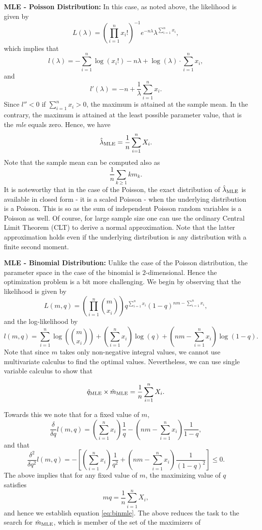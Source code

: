\documentclass[]{book}
\theoremstyle{definition}
\theoremstyle{definition}
\theoremstyle{definition}
\theoremstyle{remark}
\begin{document}
\textbf{MLE - Poisson Distribution:} In this case, as noted above, the
likelihood is given by \[
L(\lambda)=\left(\prod_{i=1}^n x_i!\right)^{-1}e^{-n\lambda}\lambda^{\sum_{i=1}^n x_i},
\] which implies that \[
l(\lambda)= -\sum_{i=1}^n \log(x_i!) -n\lambda +\log(\lambda) \cdot \sum_{i=1}^n x_i,
\] and \[
l'(\lambda)= -n +\frac{1}{\lambda}\sum_{i=1}^n x_i.
\] Since \(l''< 0\) if \(\sum_{i=1}^n x_i>0\), the maximum is attained
at the sample mean. In the contrary, the maximum is attained at the
least possible parameter value, that is the \emph{mle} equals zero.
Hence, we have\\
\[
\hat{\lambda}_{\rm MLE} = \frac{1}{n}\sum_{i=1}^n X_i. 
\] Note that the sample mean can be computed also as \[
\frac{1}{n} \sum_{k\geq 1} km_k.
\] It is noteworthy that in the case of the Poisson, the exact
distribution of \(\hat{\lambda}_{\rm MLE}\) is available in closed form
- it is a scaled Poisson - when the underlying distribution is a
Poisson. This is so as the sum of independent Poisson random variables
is a Poisson as well. Of course, for large sample size one can use the
ordinary Central Limit Theorem (CLT) to derive a normal approximation.
Note that the latter approximation holds even if the underlying
distribution is any distribution with a finite second moment.

\textbf{MLE - Binomial Distribution:} Unlike the case of the Poisson
distribution, the parameter space in the case of the binomial is
\(2\)-dimensional. Hence the optimization problem is a bit more
challenging. We begin by observing that the likelihood is given by \[
L(m,q)= \left(\prod_{i=1}^n \binom{m}{x_i}\right) q^{\sum_{i=1}^n x_i} (1-q)^{nm-\sum_{i=1}^n x_i}, 
\] and the log-likelihood by \[
l(m,q)= \sum_{i=1}^n \log\left(\binom{m}{x_i}\right) + \left({\sum_{i=1}^n x_i}\right)\log(q)+ \left({nm-\sum_{i=1}^n x_i}\right)\log(1-q). 
\] Note that since \(m\) takes only non-negative integral values, we
cannot use multivariate calculus to find the optimal values.
Nevertheless, we can use single variable calculus to show that

\begin{equation}
\hat{q}_{\rm MLE}\times \hat{m}_{\rm MLE}= \frac{1}{n}\sum_{i=1}^n X_i.  
\label{eq:binmle}
\end{equation}

Towards this we note that for a fixed value of \(m\), \[
\frac{\delta}{\delta q} l(m,q) = \left({\sum_{i=1}^n x_i}\right)\frac{1}{q}- \left({nm-\sum_{i=1}^n x_i}\right)\frac{1}{1-q},
\] and that \[
\frac{\delta^2}{\delta q^2} l(m,q) = -\left[\left({\sum_{i=1}^n x_i}\right)\frac{1}{q^2} + \left({nm-\sum_{i=1}^n x_i}\right)\frac{1}{(1-q)^2}\right]\leq 0.
\] The above implies that for any fixed value of \(m\), the maximizing
value of \(q\) satisfies \[
mq=\frac{1}{n}\sum_{i=1}^n X_i,
\] and hence we establish equation \eqref{eq:binmle}. The above reduces
the task to the search for \(\hat{m}_{\rm MLE}\), which is member of the
set of the maximizers of
\end{document}
